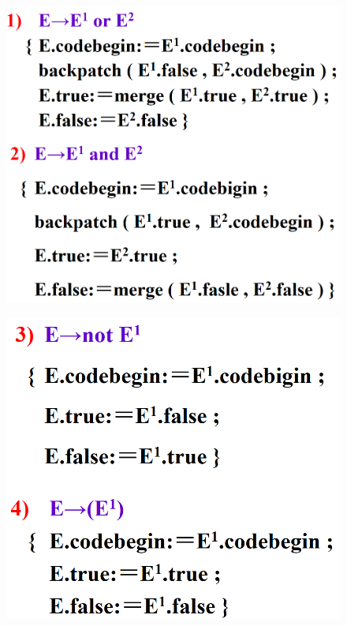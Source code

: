 \documentclass[UTF8,a4paper]{ctexart}
\begin{document}
 \begin{figure}[H]
  \centering
  \includegraphics[scale = 0.3]{assets/CompilerConstructionPrinciples_859b6.png}
 \end{figure}

 \begin{figure}[H]
  \centering
  \includegraphics[scale = 0.3]{assets/CompilerConstructionPrinciples_844ba.png}
 \end{figure}
\end{document}

